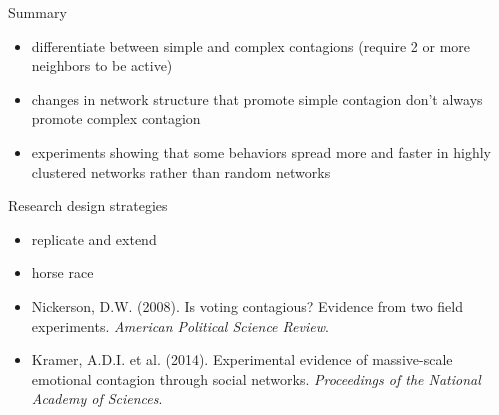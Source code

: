 \documentclass[aspectratio=169]{beamer}
\begin{document}
\begin{frame}

Summary
\begin{itemize}
\item differentiate between simple and complex contagions (require 2 or more neighbors to be active) \pause
\item changes in network structure that promote simple contagion don't always promote complex contagion \pause
\item experiments showing that some behaviors spread more and faster in highly clustered networks rather than random networks \pause
\end{itemize}


Research design strategies
\begin{itemize}
\item replicate and extend \pause
\item horse race
\end{itemize}



\end{frame}
\begin{frame}

\begin{itemize}
\item Nickerson, D.W. (2008). Is voting contagious? Evidence from two field experiments. \textit{American Political Science Review}. 
\item Kramer, A.D.I. et al. (2014). Experimental evidence of massive-scale emotional contagion through social networks. \textit{Proceedings of the National Academy of Sciences}.
\end{itemize}

\end{frame}
\end{document}
